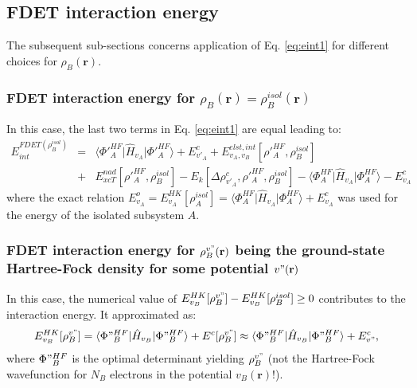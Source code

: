 \documentclass[journal=jctcce,manuscript=article]{achemso}
\begin{document}
\subsection{FDET interaction energy}
The subsequent sub-sections concerns application of Eq. \ref{eq:eint1} for different choices for $\rho_B(\mathbf{r})$. 
\subsubsection{FDET interaction energy for $\rho_B(\mathbf{r})=\rho_B^{isol}(\mathbf{r})$}
In this case, the last two terms in Eq. \ref{eq:eint1} are equal leading to:
\begin{eqnarray}
E_{int}^{FDET(\rho_B^{isol})}&=&
\langle\Phi'^{HF}_{A}\vert \hat{H}_{v_A}\vert \Phi'^{HF}_{A}\rangle + E^{c}_{v'_A}
+ E^{elst,int}_{v_A,v_B}[\rho'^{HF}_A,\rho_B^{isol}]  \label{eq:eint2}\\
&+& {E}_{xcT}^{nad}[\rho'^{HF}_A,\rho_B^{isol}]     - E_k[\Delta \rho^{c}_{v'_A}, \rho'^{HF}_A, \rho_B^{isol}]  - 
\langle\Phi^{HF}_{A}\vert \hat{H}_{v_A}\vert \Phi^{HF}_{A}\rangle - E^{c}_{v_A}
\nonumber
\end{eqnarray}
where the exact relation $E_{v_A}^o=E_{v_A}^{HK}[\rho_A^{isol}]=\langle\Phi^{HF}_{A}\vert \hat{H}_{v_A}\vert \Phi^{HF}_{A}\rangle + E^{c}_{v_A}$ was used for the energy of the isolated subsystem $A$.

 \subsubsection{FDET interaction energy for  $\rho_B^{v"}(\mathbf{r})$ being the ground-state Hartree-Fock density for some 
 potential $v"(\mathbf{r})$} 
In this case, the numerical value of 
${E}^{HK}_{v_B}[\rho_B^{v"}]-{E}^{HK}_{v_B}[\rho_B^{isol}]\ge 0$ contributes to the interaction energy. 
It approximated as:
\begin{eqnarray}
{E}^{HK}_{v_B}[\rho_B^{v"}]=\langle\Phi"^{HF}_{B}\vert \hat{H}_{v_B}\vert \Phi"^{HF}_{B}\rangle+E^{c}[\rho_B^{v"}] \approx \langle\Phi"^{HF}_{B}\vert \hat{H}_{v_B}\vert \Phi"^{HF}_{B}\rangle+E^{c}_{v"},   \label{eq:evb} 
\end{eqnarray}
where $\Phi"^{HF}_{B}$ is the optimal determinant yielding $\rho_B^{v"}$ (not the Hartree-Fock wavefunction for $N_B$ electrons in the potential ${v_B}(\mathbf{r})$!).
\end{document}
